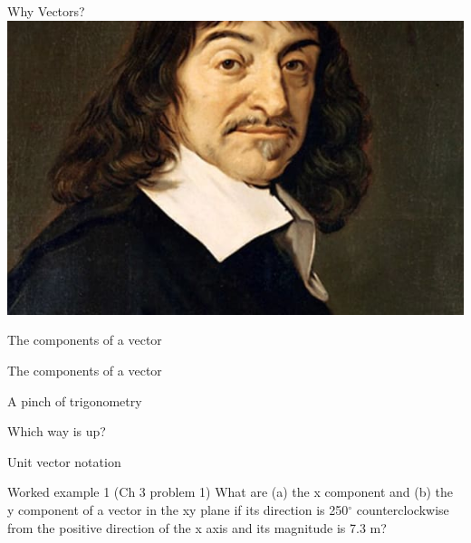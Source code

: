 \begin{frame}{Why Vectors?}
\small
\includegraphics[scale=0.2]{descartes}

\end{frame}

\begin{frame}{The components of a vector}
\small

\end{frame}


\begin{frame}{The components of a vector}
\small

\end{frame}


\begin{frame}{A pinch of trigonometry}
\small

\end{frame}

\begin{frame}{Which way is up?}
\small

\end{frame}

\begin{frame}{Unit vector notation}
\small

\end{frame}

\begin{frame}{Worked example 1 (Ch 3 problem 1)}
\small
What are (a) the x component and (b) the y component of a vector in the xy plane if its direction is 250$^{\circ}$ counterclockwise from the positive direction of the x axis and its magnitude is 7.3 m?\\[20ex]

\end{frame}

